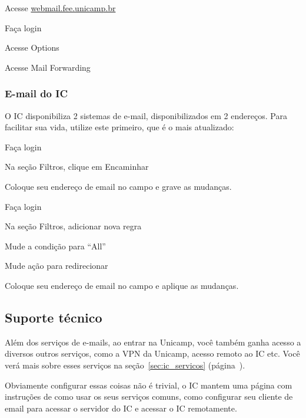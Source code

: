 \begin{compactenumerate}
\item Acesse \url{webmail.fee.unicamp.br}
\item Faça login
\item Acesse Options
\item Acesse Mail Forwarding
\end{compactenumerate}

\subsubsection{E-mail do IC}

O IC disponibiliza 2 sistemas de e-mail, disponibilizados em 2 endereços. Para
facilitar sua vida, utilize este primeiro, que é o mais atualizado:

\begin{compactenumerate}
\item {}
\item Faça login
\item Na seção Filtros, clique em Encaminhar
\item Coloque seu endereço de email no campo e grave as mudanças.
\end{compactenumerate}

\begin{compactenumerate}
\item {}
\item Faça login
\item Na seção Filtros, adicionar nova regra
\item Mude a condição para ``All''
\item Mude ação para redirecionar
\item Coloque seu endereço de email no campo e aplique as mudanças.
\end{compactenumerate}

\subsection{Suporte técnico}

Além dos serviços de e-mails, ao entrar na Unicamp, você também ganha acesso a
diversos outros serviços, como a VPN da Unicamp, acesso remoto ao IC etc. Você
verá mais sobre esses serviços na seção~\ref{sec:ic_servicos}
(página~\pageref{sec:ic_servicos}).

Obviamente configurar essas coisas não é trivial, o IC mantem uma página com
instruções de como usar os seus serviços comuns, como configurar seu cliente de
email para acessar o servidor do IC e acessar o IC remotamente.

